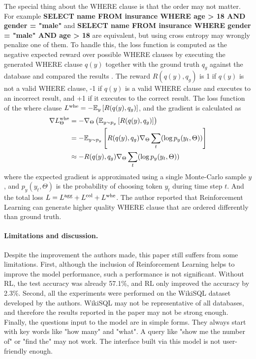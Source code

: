 The special thing about the WHERE clause is that the order may not matter. For example \textbf{SELECT name FROM insurance WHERE age > 18 AND gender = "male"} and \textbf{SELECT name FROM insurance WHERE gender = "male" AND age > 18} are equivalent, but using cross entropy may wrongly penalize one of them. To handle this, the loss function is computed as the negative expected reward over possible WHERE clauses by executing the generated WHERE clause $q(y)$ together with the ground truth $q_g$ against the database and compared the results . The reward $R(q(y), q_g)$ is 1 if $q(y)$ is not a valid WHERE clause, -1 if $q(y)$ is a valid WHERE clause and executes to an incorrect result, and +1 if it executes to the correct result. The loss function of the where clause $L^{\rm whe} = - \mathbb{E}_y\left[ R(q(y), q_g) \right]$, and the gradient is calculated as
\begin{align*}
    \nabla L^{\rm whe}_{\Theta} & = -\nabla_{\Theta} \left(\mathbb{E}_{y \sim p_y}\left[ R(q(y), q_g) \right]   \right) \\
    &= - \mathbb{E}_{y \sim p_y}\left[ R(q(y), q_g)  \nabla_{\Theta} \sum_t(\log p_y(y_t, \Theta)) \right] \\
    &\approx -R(q(y), q_g) \nabla_{\Theta} \sum_t(\log p_y(y_t, \Theta))
\end{align*}
where the expected gradient is approximated using a single Monte-Carlo sample $y$, and $p_y(y_t, \Theta)$ is the probability of choosing token $y_t$ during time step $t$. And the total loss $L = L^{\rm agg} + L^{\rm col} + L^{\rm whe}$. The author reported that Reinforcement Learning can generate higher quality WHERE clause that are ordered differently than ground truth.

\paragraph{Limitations and discussion.}
Despite the improvement the authors made, this paper still suffers from some limitations. First, although the inclusion of Reinforcement Learning helps to improve the model performance, such a performance is not significant. Without RL, the test accuracy was already 57.1\%, and RL only improved the accuracy by 2.3\%. Second, all the experiments were performed on the WikiSQL dataset developed by the authors. WikiSQL may not be representative of all databases, and therefore the results reported in the paper may not be strong enough. Finally, the questions input to the model are in simple forms. They always start with key words like "how many" and "what". A query like "show me the number of" or "find the" may not work. The interface built via this model is not user-friendly enough.

